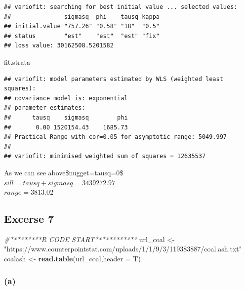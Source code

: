 \documentclass[]{article}
\newenvironment{Shaded}{\begin{snugshade}}{\end{snugshade}}
\newcommand{\KeywordTok}[1]{\textcolor[rgb]{0.13,0.29,0.53}{\textbf{#1}}}
\newcommand{\DataTypeTok}[1]{\textcolor[rgb]{0.13,0.29,0.53}{#1}}
\newcommand{\StringTok}[1]{\textcolor[rgb]{0.31,0.60,0.02}{#1}}
\newcommand{\CommentTok}[1]{\textcolor[rgb]{0.56,0.35,0.01}{\textit{#1}}}
\newcommand{\NormalTok}[1]{#1}
\begin{document}
\begin{verbatim}
## variofit: searching for best initial value ... selected values:
##               sigmasq  phi    tausq kappa
## initial.value "757.26" "0.58" "18"  "0.5"
## status        "est"    "est"  "est" "fix"
## loss value: 30162508.5201582
\end{verbatim}

\begin{Shaded}
\begin{Highlighting}[]
\NormalTok{fit.strata}
\end{Highlighting}
\end{Shaded}

\begin{verbatim}
## variofit: model parameters estimated by WLS (weighted least squares):
## covariance model is: exponential
## parameter estimates:
##      tausq    sigmasq        phi 
##       0.00 1520154.43    1685.73 
## Practical Range with cor=0.05 for asymptotic range: 5049.997
## 
## variofit: minimised weighted sum of squares = 12635537
\end{verbatim}

As we can see above\$nugget=tausq=0\$\\
\(sill=tausq+sigmasq=3439272.97\)\\
\(range=3813.02\)

\subsection{Excerse 7}\label{excerse-7}

\begin{Shaded}
\begin{Highlighting}[]
\CommentTok{#*********R CODE START************}
\NormalTok{url_coal <-}\StringTok{ "https://www.counterpointstat.com/uploads/1/1/9/3/119383887/coal.ash.txt"}
\NormalTok{coalash <-}\StringTok{ }\KeywordTok{read.table}\NormalTok{(url_coal,}\DataTypeTok{header =}\NormalTok{ T)}
\end{Highlighting}
\end{Shaded}

\subsubsection{(a)}\label{a-1}
\end{document}

